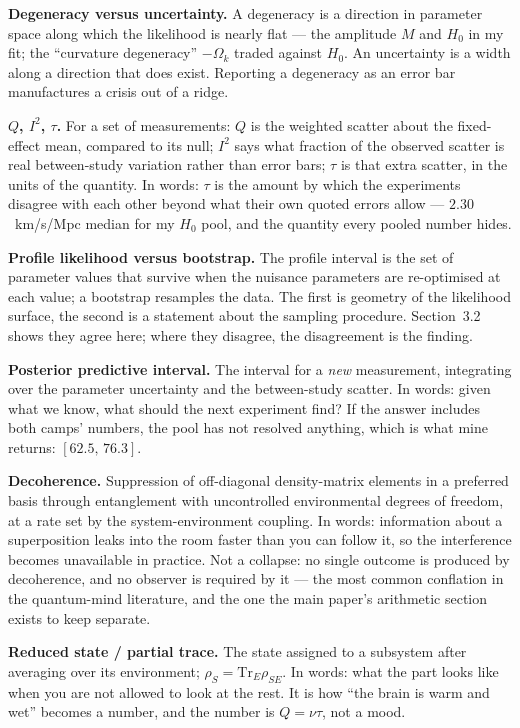 \documentclass[11pt]{article}
\begin{document}
\textbf{Degeneracy versus uncertainty.} A degeneracy is a direction in parameter space along which the
likelihood is nearly flat --- the amplitude $M$ and $H_0$ in my fit; the ``curvature degeneracy''
$-\Omega_k$ traded against $H_0$. An uncertainty is a width along a direction that does exist.
Reporting a degeneracy as an error bar manufactures a crisis out of a ridge.

\textbf{$Q$, $I^2$, $\tau$.} For a set of measurements: $Q$ is the weighted scatter about the
fixed-effect mean, compared to its null; $I^2$ says what fraction of the observed scatter is
real between-study variation rather than error bars; $\tau$ is that extra scatter, in the units of the
quantity. In words: $\tau$ is the amount by which the experiments disagree with each other beyond what
their own quoted errors allow --- $2.30$~km/s/Mpc median for my $H_0$ pool, and the quantity every
pooled number hides.

\textbf{Profile likelihood versus bootstrap.} The profile interval is the set of parameter values that
survive when the nuisance parameters are re-optimised at each value; a bootstrap resamples the data.
The first is geometry of the likelihood surface, the second is a statement about the sampling
procedure. Section~3.2 shows they agree here; where they disagree, the disagreement is the finding.

\textbf{Posterior predictive interval.} The interval for a \emph{new} measurement, integrating over
the parameter uncertainty and the between-study scatter. In words: given what we know, what should the
next experiment find? If the answer includes both camps' numbers, the pool has not resolved anything,
which is what mine returns: $[62.5,\,76.3]$.

\textbf{Decoherence.} Suppression of off-diagonal density-matrix elements in a preferred basis through
entanglement with uncontrolled environmental degrees of freedom, at a rate set by the system-environment
coupling. In words: information about a superposition leaks into the room faster than you can follow
it, so the interference becomes unavailable in practice. Not a collapse: no single outcome is produced
by decoherence, and no observer is required by it --- the most common conflation in the quantum-mind
literature, and the one the main paper's arithmetic section exists to keep separate.

\textbf{Reduced state / partial trace.} The state assigned to a subsystem after averaging over its
environment; $\rho_S = \mathrm{Tr}_E \rho_{SE}$. In words: what the part looks like when you are not
allowed to look at the rest. It is how ``the brain is warm and wet'' becomes a number, and the number is
$Q=\nu\tau$, not a mood.
\end{document}
